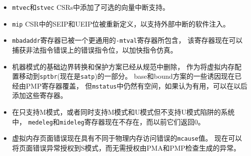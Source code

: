 \begin{itemize}
\item {\tt mtvec}和{\tt stvec} CSRs中添加了可选的向量中断支持。
\item {\tt mip} CSR中的SEIP和UEIP位被重新定义，以支持外部中断的软件注入。
\item {\tt mbadaddr}寄存器已被一个更通用的{\tt-mtval}寄存器所包含，
该寄存器现在可以捕获非法指令错误上的错误指令位，以加快指令仿真。
\item 机器模式的基础边界转换和保护方案已经从规范中删除，
作为将虚拟内存配置移动到{\tt sptbr}(现在是{\tt satp})的一部分。
base和bound方案的一些诱因现在已经由PMP寄存器覆盖，
但{\tt mstatus}中仍然有空间，如果认为有用，可以在以后添加这些寄存器。
\item 在只支持M模式，或者同时支持M模式和U模式但不支持U模式陷阱的系统中，
{\tt medeleg}和{\tt mideleg}寄存器现在不存在，而以前它们返回0。
\item 虚拟内存页面错误现在具有不同于物理内存访问错误的{\tt mcause}值。
现在可以将页面错误异常授权到S模式，而无需授权由PMA和PMP检查生成的异常。

\end{itemize}
